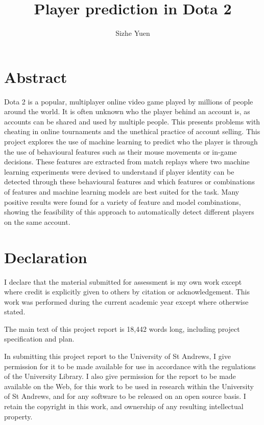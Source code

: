 \documentclass{sty/SizheArticle}
\title{Player prediction in Dota 2}
\author{Sizhe Yuen}
\begin{document}

\newpage
{}


\section*{Abstract}
Dota 2 is a popular, multiplayer online video game played by millions of people around the world. It is often unknown who the player behind an account is, as accounts can be shared and used by multiple people. This presents problems with cheating in online tournaments and the unethical practice of account selling. This project explores the use of machine learning to predict who the player is through the use of behavioural features such as their mouse movements or in-game decisions. These features are extracted from match replays where two machine learning experiments were devised to understand if player identity can be detected through these behavioural features and which features or combinations of features and machine learning models are best suited for the task. Many positive results were found for a variety of feature and model combinations, showing the feasibility of this approach to automatically detect different players on the same account. 


\section*{Declaration}
I declare that the material submitted for assessment is my own work except where credit is explicitly given to others by citation or acknowledgement. This work was performed during the current academic year except where otherwise stated.

The main text of this project report is 18,442 words long, including project specification and plan.

In submitting this project report to the University of St Andrews, I give permission for it to be made available for use in accordance with the regulations of the University Library. I also give permission for the report to be made available on the Web, for this work to be used in research within the University of St Andrews, and for any software to be released on an open source basis. I retain the copyright in this work, and ownership of any resulting intellectual property.
\end{document}
